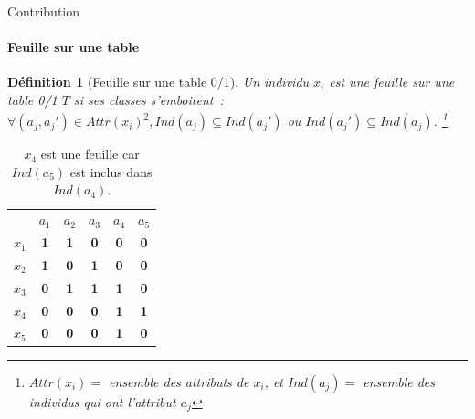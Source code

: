 \documentclass{beamer}
\newtheorem{de}{Définition}
\begin{document}
  \begin{frame}{Contribution}
  \framesubtitle{Feuille sur une table}
  \begin{de}[Feuille sur une table 0/1]
  Un individu $x_i$ est une feuille sur une table 0/1 $T$ si ses classes s'emboitent~:
  $\forall (a_j, a_j') \in Attr(x_i)^2, Ind(a_j) \subseteq Ind(a_j')$ ou $Ind(a_j') \subseteq Ind(a_j)$.
  \footnote{$Attr(x_i) =$ ensemble des attributs de $x_i$, et $Ind(a_j) =$ ensemble des individus qui ont l'attribut $a_j$}
  \end{de}
  \begin{table}[htb]
	\centering
  \begin{tabular}{lccccc}
  & $a_1$ & $a_2$ & $a_3$ & $a_4$ & $a_5$\\
  $x_1$ & \textbf{1} & \textbf{1} & \textbf{0} & \textbf{0} & \textbf{0}\\
  $x_2$ & \textbf{1} & \textbf{0} & \textbf{1} & \textbf{0} & \textbf{0}\\
  $x_3$ & \textbf{0} & \textbf{1} & \textbf{1} & \textbf{1} & \textbf{0}\\
  $x_4$ & \textbf{0} & \textbf{0} & \textbf{0} & \textbf{1} & \textbf{1}\\
  $x_5$ & \textbf{0} & \textbf{0} & \textbf{0} & \textbf{1} & \textbf{0}
  \end{tabular}
  \caption{$x_4$ est une feuille car $Ind(a_5)$ est inclus dans $Ind(a_4)$.}
  \end{table}

  \end{frame}
\end{document}
